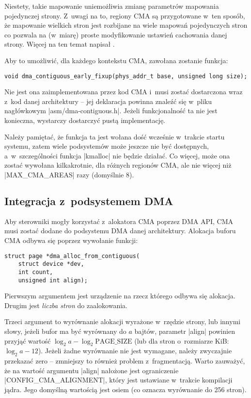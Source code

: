 Niestety, takie mapowanie uniemożliwia zmianę parametrów mapowania
pojedynczej strony.  Z~uwagi na to, regiony CMA są przygotowane w~ten
sposób, że mapowanie wielkich stron jest rozbijane na wiele mapowań
pojedynczych stron co pozwala na (w~miarę) proste modyfikowanie
ustawień cachowania danej strony.  Więcej na ten temat napisał
\textcite{bib:cma-and-arm}.

Aby to umożliwić, dla każdego kontekstu CMA, zawołana zostanie funkcja:

\begin{lstlisting}
void dma_contiguous_early_fixup(phys_addr_t base, unsigned long size);
\end{lstlisting}

Nie jest ona zaimplementowana przez kod CMA i~musi zostać dostarczona
wraz z~kod danej architektury -- jej deklaracja powinna znaleźć się
w~pliku nagłówkowym \code|asm/dma-contiguous.h|.  Jeżeli
funkcjonalność ta nie jest konieczna, wystarczy dostarczyć pustą
implementację.

Należy pamiętać, że funkcja ta jest wołana dość wcześnie w~trakcie
startu systemu, zatem wiele podsystemów może jeszcze nie być
dostępnych, a~w~szczególności funkcja \code|kmalloc| nie będzie
działać.  Co więcej, może ona zostać wywołana kilkakrotnie, dla
różnych regionów CMA, ale nie więcej niż \code|MAX_CMA_AREAS|
razy (domyślnie 8).

\subsection{Integracja z~podsystemem DMA}\label{sec:usage-integrate}

Aby sterowniki mogły korzystać z~alokatora CMA poprzez DMA API, CMA
musi zostać dodane do podsystemu DMA danej architektury.  Alokacja
buforu CMA odbywa się poprzez wywołanie funkcji:

\begin{lstlisting}
struct page *dma_alloc_from_contiguous(
	struct device *dev,
	int count,
	unsigned int align);
\end{lstlisting}

Pierwszym argumentem jest urządzenie na rzecz którego odbywa się
alokacja.  Drugim jest \emph{liczba stron} do zaalokowania.

Trzeci argument to wyrównanie alokacji wyrażone w~rzędzie strony, lub
innymi słowy, jeżeli bufor ma być wyrównany do $a$ bajtów, parametr
\code|align| powinien przyjąć wartość $\log_2 a - \log_2
\mathrm{PAGE\_SIZE}$ (lub dla stron o~rozmiarze \unit[4096]{KiB}:
$\log_2 a - 12$).  Jeżeli żadne wyrównanie nie jest wymagane, należy
zwyczajnie przekazać zero -- zmniejszy to również problem
z~fragmentacją.  Warto zauważyć, że na wartość argumentu
\code|align| nałożone jest ograniczenie
\code|CONFIG_CMA_ALIGNMENT|, który jest ustawiane w~trakcie
kompilacji jądra.  Jego domyślną wartością jest osiem (co oznacza
wyrównanie do 256 stron).

